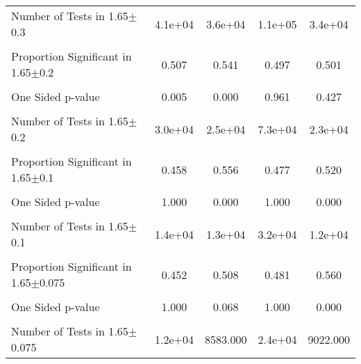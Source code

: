 {\begin{tabular}{l*{4}{c}}
Number of Tests in 1.65$\pm$0.3&  4.1e+04         &  3.6e+04         &  1.1e+05         &  3.4e+04         \\
                &                  &                  &                  &                  \\
\hline Proportion Significant in 1.65$\pm$0.2&    0.507         &    0.541         &    0.497         &    0.501         \\
                &                  &                  &                  &                  \\
One Sided p-value&    0.005         &    0.000         &    0.961         &    0.427         \\
                &                  &                  &                  &                  \\
Number of Tests in 1.65$\pm$0.2&  3.0e+04         &  2.5e+04         &  7.3e+04         &  2.3e+04         \\
                &                  &                  &                  &                  \\
\hline Proportion Significant in 1.65$\pm$0.1&    0.458         &    0.556         &    0.477         &    0.520         \\
                &                  &                  &                  &                  \\
One Sided p-value&    1.000         &    0.000         &    1.000         &    0.000         \\
                &                  &                  &                  &                  \\
Number of Tests in 1.65$\pm$0.1&  1.4e+04         &  1.3e+04         &  3.2e+04         &  1.2e+04         \\
                &                  &                  &                  &                  \\
\hline Proportion Significant in 1.65$\pm$0.075&    0.452         &    0.508         &    0.481         &    0.560         \\
                &                  &                  &                  &                  \\
One Sided p-value&    1.000         &    0.068         &    1.000         &    0.000         \\
                &                  &                  &                  &                  \\
Number of Tests in 1.65$\pm$0.075&  1.2e+04         & 8583.000         &  2.4e+04         & 9022.000         \\

\end{tabular}}
